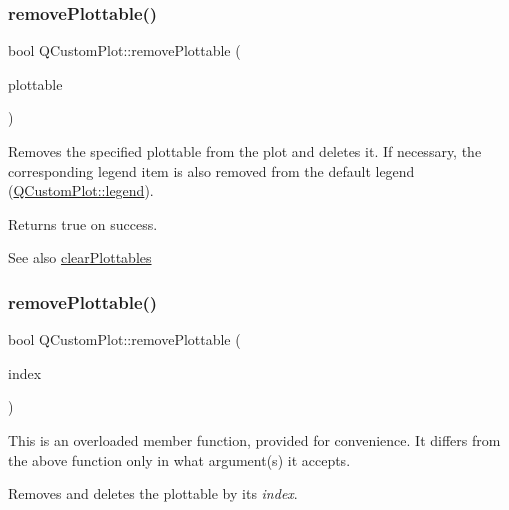 \subsubsection{\texorpdfstring{remove\+Plottable()}{removePlottable()}\hspace{0.1cm}{\footnotesize\ttfamily [1/2]}}
{\footnotesize\ttfamily bool Q\+Custom\+Plot\+::remove\+Plottable (\begin{DoxyParamCaption}\item[{\hyperlink{class_q_c_p_abstract_plottable}{Q\+C\+P\+Abstract\+Plottable} $\ast$}]{plottable }\end{DoxyParamCaption})}

Removes the specified plottable from the plot and deletes it. If necessary, the corresponding legend item is also removed from the default legend (\hyperlink{class_q_custom_plot_a4eadcd237dc6a09938b68b16877fa6af}{Q\+Custom\+Plot\+::legend}).

Returns true on success.

\begin{DoxySeeAlso}{See also}
\hyperlink{class_q_custom_plot_a9a409bb3201878adb7ffba1c89c4e004}{clear\+Plottables} 
\end{DoxySeeAlso}
\mbox{\label{class_q_custom_plot_afc210e0021480f8119bccf37839dbcc8}} 
\subsubsection{\texorpdfstring{remove\+Plottable()}{removePlottable()}\hspace{0.1cm}{\footnotesize\ttfamily [2/2]}}
{\footnotesize\ttfamily bool Q\+Custom\+Plot\+::remove\+Plottable (\begin{DoxyParamCaption}\item[{int}]{index }\end{DoxyParamCaption})}

This is an overloaded member function, provided for convenience. It differs from the above function only in what argument(s) it accepts.

Removes and deletes the plottable by its {\itshape index}. \mbox{\label{class_q_custom_plot_aa4bfe7d70dbe67e81d877819b75ab9af}} 
